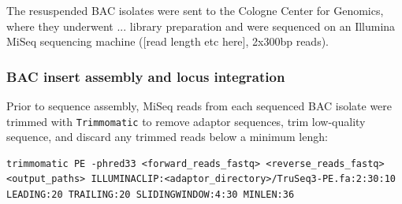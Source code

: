 
The resuspended BAC isolates were sent to the Cologne Center for Genomics, where they underwent ... library preparation and were sequenced on an Illumina MiSeq sequencing machine ([read length etc here], 2x300bp reads).

\subsubsection{BAC insert assembly and locus integration}
\label{sec:bac-methods-assembly}

Prior to sequence assembly, MiSeq reads from each sequenced BAC isolate were trimmed with \lstinline{Trimmomatic} \parencite{bolger2014trimmomatic} to remove adaptor sequences, trim low-quality sequence, and discard any trimmed reads below a minimum lengh:

\begin{lstlisting}
trimmomatic PE -phred33 <forward_reads_fastq> <reverse_reads_fastq> <output_paths> ILLUMINACLIP:<adaptor_directory>/TruSeq3-PE.fa:2:30:10 LEADING:20 TRAILING:20 SLIDINGWINDOW:4:30 MINLEN:36
\end{lstlisting}

